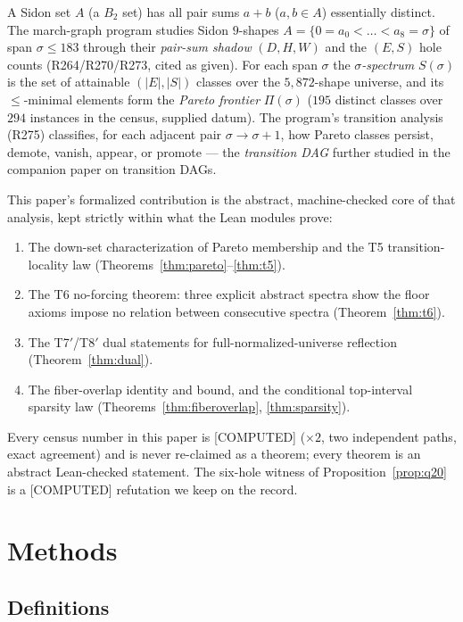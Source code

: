 \documentclass[11pt,a4paper]{article}
\theoremstyle{definition}
\begin{document}
A Sidon set $A$ (a $B_2$ set) has all pair sums $a+b$ ($a,b\in A$)
essentially distinct. The march-graph program studies Sidon $9$-shapes
$A=\{0=a_0<\dots<a_8=\sigma\}$ of span $\sigma\le183$ through their
\emph{pair-sum shadow} $(D,H,W)$ and the $(E,S)$ hole counts
(R264/R270/R273, cited as given). For each span $\sigma$ the
\emph{$\sigma$-spectrum} $S(\sigma)$ is the set of attainable
$(|E|,|S|)$ classes over the $5{,}872$-shape universe, and its
$\le$-minimal elements form the \emph{Pareto frontier} $\Pi(\sigma)$
($195$ distinct classes over $294$ instances in the census, supplied
datum). The program's transition analysis (R275) classifies, for each
adjacent pair $\sigma\to\sigma+1$, how Pareto classes persist, demote,
vanish, appear, or promote --- the \emph{transition DAG} further studied
in the companion paper on transition DAGs.

This paper's formalized contribution is the abstract, machine-checked
core of that analysis, kept strictly within what the Lean modules prove:
\begin{enumerate}
\item The down-set characterization of Pareto membership and the T5
  transition-locality law (Theorems~\ref{thm:pareto}--\ref{thm:t5}).
\item The T6 no-forcing theorem: three explicit abstract spectra show
  the floor axioms impose no relation between consecutive spectra
  (Theorem~\ref{thm:t6}).
\item The T7$'$/T8$'$ dual statements for full-normalized-universe
  reflection (Theorem~\ref{thm:dual}).
\item The fiber-overlap identity and bound, and the conditional
  top-interval sparsity law (Theorems~\ref{thm:fiberoverlap},
  \ref{thm:sparsity}).
\end{enumerate}
Every census number in this paper is [COMPUTED] ($\times2$, two
independent paths, exact agreement) and is never re-claimed as a
theorem; every theorem is an abstract Lean-checked statement. The
six-hole witness of Proposition~\ref{prop:q20} is a [COMPUTED]
refutation we keep on the record.

\section{Methods}

\subsection{Definitions}
\end{document}
